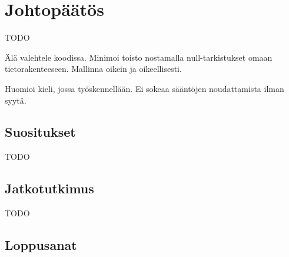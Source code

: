 \vspace{21.5pt}
\chapter{Johtopäätös}
TODO

Älä valehtele koodissa. Minimoi toisto nostamalla null-tarkistukset omaan tietorakenteeseen.
Mallinna oikein ja oikeellisesti.

Huomioi kieli, jossa työskennellään. Ei sokeaa sääntöjen noudattamista ilman syytä.

\section{Suositukset}

TODO


\section{Jatkotutkimus}

TODO

\section{Loppusanat}


